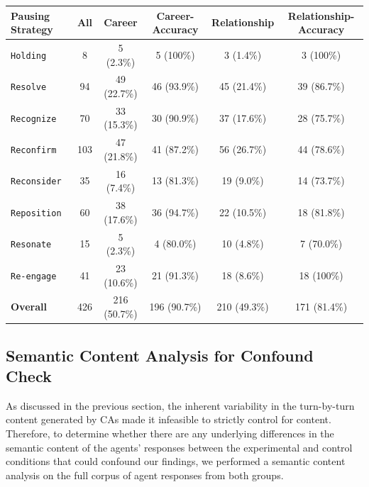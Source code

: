     \begin{table}[t!]
        \centering %
        \small
        \renewcommand{\arraystretch}{1}
        \label{tab:strategy}
        \begin{tabular}{lccccc}
            \toprule
            \bfseries Pausing Strategy & \bfseries All & \bfseries Career & Career-Accuracy & \bfseries Relationship & Relationship-Accuracy\\
            \midrule
            \texttt{Holding} & 8 & 5 (2.3\%) & 5 (100\%) & 3 (1.4\%) & 3 (100\%)\\
           \texttt{Resolve} & 94 & 49 (22.7\%) & 46 (93.9\%) & 45 (21.4\%) & 39 (86.7\%)\\
           \texttt{Recognize} & 70 & 33 (15.3\%) &30 (90.9\%) & 37 (17.6\%) & 28 (75.7\%)\\
           \texttt{Reconfirm} & 103 & 47 (21.8\%) & 41 (87.2\%) & 56 (26.7\%) & 44 (78.6\%)\\
           \texttt{Reconsider} & 35 & 16 (7.4\%) & 13 (81.3\%) & 19 (9.0\%) & 14 (73.7\%)\\
           \texttt{Reposition} & 60 & 38 (17.6\%)& 36 (94.7\%) & 22 (10.5\%)& 18 (81.8\%)\\
           \texttt{Resonate} & 15  & 5 (2.3\%)& 4 (80.0\%) & 10 (4.8\%) & 7 (70.0\%)\\
           \texttt{Re-engage} & 41 & 23 (10.6\%) & 21 (91.3\%) & 18 (8.6\%) & 18 (100\%)\\
           \midrule
           \bfseries Overall & 426 & 216 (50.7\%) & 196 (90.7\%) & 210 (49.3\%)  & 171 (81.4\%)\\
            \bottomrule
        \end{tabular}
        \end{table}

\subsection{Semantic Content Analysis for Confound Check}
\label{subsec:semantic}
As discussed in the previous section, the inherent variability in the turn-by-turn content generated by CAs made it infeasible to strictly control for content. Therefore, to determine whether there are any underlying differences in the semantic content of the agents' responses between the experimental and control conditions that could confound our findings, we performed a semantic content analysis on the full corpus of agent responses from both groups.

